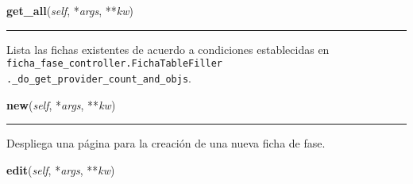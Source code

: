 \hspace{.8\funcindent}\begin{boxedminipage}{\funcwidth}

    \raggedright \textbf{get\_all}(\textit{self}, *\textit{args}, **\textit{kw})

    \vspace{-1.5ex}

    \rule{\textwidth}{0.5\fboxrule}
\setlength{\parskip}{2ex}
    Lista las fichas existentes de acuerdo a condiciones establecidas en 
    \texttt{ficha\_fase\_controller.FichaTableFiller 
    .\_do\_get\_provider\_count\_and\_objs}.

\setlength{\parskip}{1ex}
    \end{boxedminipage}

    \label{saip:controllers:ficha_fase_controller:FichaFaseController:new}

    \vspace{0.5ex}

\hspace{.8\funcindent}\begin{boxedminipage}{\funcwidth}

    \raggedright \textbf{new}(\textit{self}, *\textit{args}, **\textit{kw})

    \vspace{-1.5ex}

    \rule{\textwidth}{0.5\fboxrule}
\setlength{\parskip}{2ex}
    Despliega una página para la creación de una nueva ficha de fase.

\setlength{\parskip}{1ex}
    \end{boxedminipage}

    \label{saip:controllers:ficha_fase_controller:FichaFaseController:edit}

    \vspace{0.5ex}

\hspace{.8\funcindent}\begin{boxedminipage}{\funcwidth}

    \raggedright \textbf{edit}(\textit{self}, *\textit{args}, **\textit{kw})

\setlength{\parskip}{2ex}
\setlength{\parskip}{1ex}
    \end{boxedminipage}

